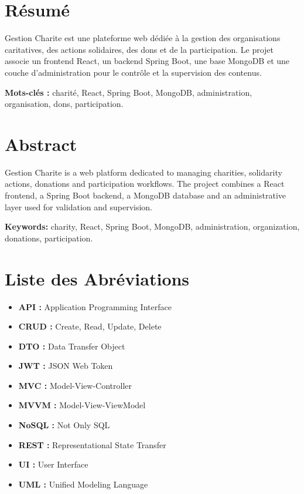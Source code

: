 \documentclass[12pt,a4paper]{report}
\begin{document}
\newpage
\chapter*{Résumé}
Gestion Charite est une plateforme web dédiée à la gestion des organisations caritatives, des actions solidaires, des dons et de la participation. Le projet associe un frontend React, un backend Spring Boot, une base MongoDB et une couche d'administration pour le contrôle et la supervision des contenus.

\textbf{Mots-clés :} charité, React, Spring Boot, MongoDB, administration, organisation, dons, participation.

\newpage
\chapter*{Abstract}
Gestion Charite is a web platform dedicated to managing charities, solidarity actions, donations and participation workflows. The project combines a React frontend, a Spring Boot backend, a MongoDB database and an administrative layer used for validation and supervision.

\textbf{Keywords:} charity, React, Spring Boot, MongoDB, administration, organization, donations, participation.

\newpage
\chapter*{Liste des Abréviations}
\begin{itemize}[label=\textbullet, itemsep=8pt]
  \item \textbf{API :} Application Programming Interface
  \item \textbf{CRUD :} Create, Read, Update, Delete
  \item \textbf{DTO :} Data Transfer Object
  \item \textbf{JWT :} JSON Web Token
  \item \textbf{MVC :} Model-View-Controller
  \item \textbf{MVVM :} Model-View-ViewModel
  \item \textbf{NoSQL :} Not Only SQL
  \item \textbf{REST :} Representational State Transfer
  \item \textbf{UI :} User Interface
  \item \textbf{UML :} Unified Modeling Language
\end{itemize}
\end{document}

